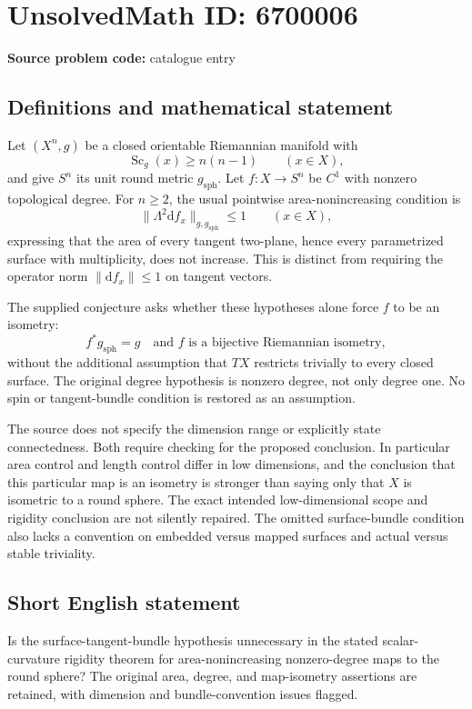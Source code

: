 \documentclass[11pt]{article}
\begin{document}
\section*{UnsolvedMath ID: 6700006}
\textbf{Source problem code:} catalogue entry
\subsection{Definitions and mathematical statement}
Let $(X^n,g)$ be a closed orientable Riemannian manifold with
\[
 \operatorname{Sc}_g(x)\ge n(n-1)\qquad(x\in X),
\]
and give $S^n$ its unit round metric $g_{\mathrm{sph}}$. Let $f:X\to S^n$ be $C^1$ with nonzero topological degree. For $n\ge2$, the usual pointwise area-nonincreasing condition is
\[
 \|\Lambda^2\mathrm df_x\|_{g,g_{\mathrm{sph}}}\le1
 \qquad(x\in X),
\]
expressing that the area of every tangent two-plane, hence every parametrized surface with multiplicity, does not increase. This is distinct from requiring the operator norm $\|\mathrm df_x\|\le1$ on tangent vectors.

The supplied conjecture asks whether these hypotheses alone force $f$ to be an isometry:
\[
 f^*g_{\mathrm{sph}}=g
 \quad\text{and }f\text{ is a bijective Riemannian isometry},
\]
without the additional assumption that $TX$ restricts trivially to every closed surface. The original degree hypothesis is nonzero degree, not only degree one. No spin or tangent-bundle condition is restored as an assumption.

The source does not specify the dimension range or explicitly state connectedness. Both require checking for the proposed conclusion. In particular area control and length control differ in low dimensions, and the conclusion that this particular map is an isometry is stronger than saying only that $X$ is isometric to a round sphere. The exact intended low-dimensional scope and rigidity conclusion are not silently repaired. The omitted surface-bundle condition also lacks a convention on embedded versus mapped surfaces and actual versus stable triviality.
\subsection{Short English statement}
Is the surface-tangent-bundle hypothesis unnecessary in the stated scalar-curvature rigidity theorem for area-nonincreasing nonzero-degree maps to the round sphere? The original area, degree, and map-isometry assertions are retained, with dimension and bundle-convention issues flagged.
\end{document}
